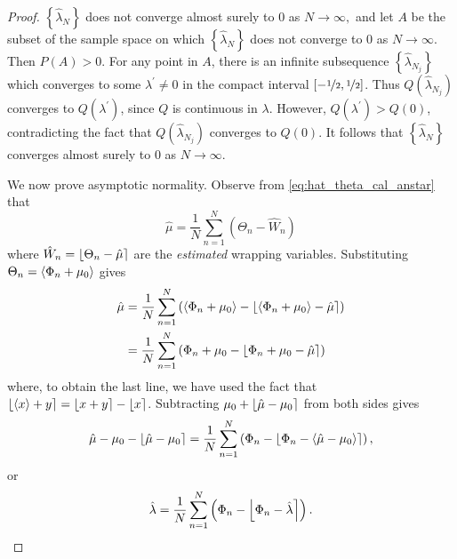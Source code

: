 \documentclass[journal]{../bib/IEEEtran}
\begin{document}
\begin{proof}
$\left\{ \hat{\lambda}_{N}\right\} $ does not converge almost surely to $0$ as $N\rightarrow\infty,$ and let $A$ be the subset of the sample space on which $\left\{  \hat{\lambda}_{N}\right\}  $ does not converge to 0 as $N\rightarrow\infty$. Then $P\left(  A\right)  >0$.  For any point in $A$, there is an infinite subsequence $\left\{  \hat{\lambda}_{N_{j}}\right\}$ which converges to some $\lambda^{\prime}\neq0$ in the compact interval $[-\nicefrac{1}{2}, \nicefrac{1}{2}]$.  Thus $Q\left(\hat{\lambda}_{N_{j}}\right)$ converges to $Q\left(\lambda^{\prime}\right)$, since $Q$ is continuous in $\lambda$.  However, $Q\left(\lambda^{\prime}\right) > Q\left(  0\right)$, contradicting the fact that $Q\left( \hat{\lambda}_{N_{j}}\right)  $ converges to $Q(0)$.  It follows that $\left\{\hat{\lambda}_{N}\right\}$ converges almost
surely to $0$ as $N\rightarrow\infty$.

We now prove asymptotic normality. Observe from \eqref{eq:hat_theta_cal_anstar} that
\[
\hat{\mu} = \frac{1}{N}\sum_{n=1}^{N}{\left( \Theta_n - \hat{W}_n \right)}
\]
where $\hat{W}_n = {\left\lfloor \Theta_n - \hat{\mu} \right\rceil}$ are the \emph{estimated} wrapping variables. Substituting $\Theta_n = \left< \Phi_n + \mu_0 \right>$ gives
\begin{align*}
\hat{\mu} &= %
\frac{1}{N}\sum_{n=1}^{N} \left( \fracpart{\Phi_n + \mu_0} - \round{ \fracpart{\Phi_n + \mu_0} - \hat{\mu}} \right) \\
&= \frac{1}{N}\sum_{n=1}^{N} \left( \Phi_n + \mu_0 - \round{ \Phi_n + \mu_0 - \hat{\mu}} \right)
\end{align*}
where, to obtain the last line, we have used the fact that ${\left\lfloor \left< x \right> + y \right\rceil} = {\left\lfloor x + y \right\rceil} - {\left\lfloor x \right\rceil}$. Subtracting $\mu_0 + {\left\lfloor \hat{\mu} - \mu_0 \right\rceil}$ from both sides gives
\[
\hat{\mu} - \mu_0 - {\left\lfloor \hat{\mu} - \mu_0 \right\rceil} = \frac{1}{N}\sum_{n=1}^{N} \left( \Phi_n - {\left\lfloor  \Phi_n - \left< \hat{\mu} - \mu_0 \right> \right\rceil} \right),
\]
or
\[
\hat{\lambda} = \frac{1}{N}\sum_{n=1}^{N} \left( \Phi_n - {\left\lfloor  \Phi_n - \hat{\lambda}  \right\rceil}\right).
\]


\end{proof}
\end{document}
